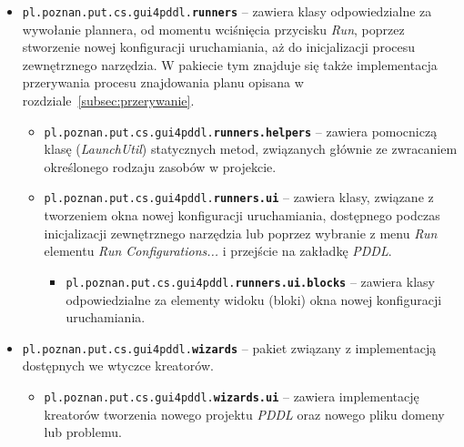 \begin{itemize}
\item \texttt{pl.poznan.put.cs.gui4pddl.\textbf{runners}} -- zawiera klasy odpowiedzialne za wywołanie plannera, od momentu wciśnięcia przycisku \textit{Run}, poprzez stworzenie nowej konfiguracji uruchamiania, aż do inicjalizacji procesu zewnętrznego narzędzia. W pakiecie tym znajduje się także implementacja przerywania procesu znajdowania planu opisana w rozdziale~\ref{subsec:przerywanie}.
\begin{itemize}
\item \texttt{pl.poznan.put.cs.gui4pddl.\textbf{runners.helpers}} -- zawiera pomocniczą klasę (\textit{LaunchUtil}) statycznych metod, związanych głównie ze zwracaniem określonego rodzaju zasobów w projekcie.
\item \texttt{pl.poznan.put.cs.gui4pddl.\textbf{runners.ui}} -- zawiera klasy, związane z tworzeniem okna nowej konfiguracji uruchamiania, dostępnego podczas inicjalizacji zewnętrznego narzędzia lub poprzez wybranie z menu \textit{Run} elementu \textit{Run Configurations...} i przejście na zakładkę \textit{PDDL}.
\begin{itemize}
\item \texttt{pl.poznan.put.cs.gui4pddl.\textbf{runners.ui.blocks}} -- zawiera klasy odpowiedzialne za elementy widoku (bloki) okna nowej konfiguracji uruchamiania.
\end{itemize}
\end{itemize}
\item \texttt{pl.poznan.put.cs.gui4pddl.\textbf{wizards}} -- pakiet związany z implementacją dostępnych we wtyczce kreatorów.
\begin{itemize}
\item \texttt{pl.poznan.put.cs.gui4pddl.\textbf{wizards.ui}} -- zawiera implementację kreatorów tworzenia nowego projektu \textit{PDDL} oraz nowego pliku domeny lub problemu.
\end{itemize}
\end{itemize}